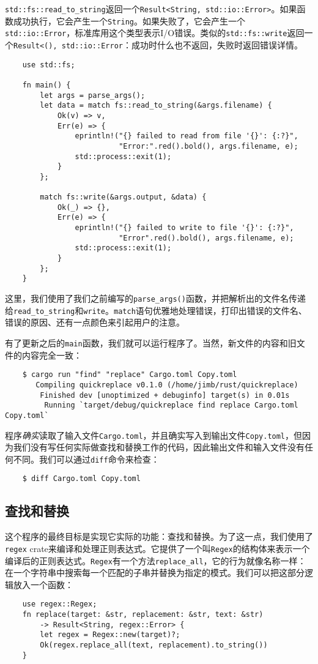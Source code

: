\texttt{std::fs::read\_to\_string}返回一个\texttt{Result<String, std::io::Error>}。如果函数成功执行，它会产生一个\texttt{String}。如果失败了，它会产生一个\texttt{std::io::Error}，标准库用这个类型表示I/O错误。类似的\texttt{std::fs::write}返回一个\texttt{Result<(), std::io::Error}：成功时什么也不返回，失败时返回错误详情。

\begin{verbatim}
    use std::fs;

    fn main() {
        let args = parse_args();
        let data = match fs::read_to_string(&args.filename) {
            Ok(v) => v,
            Err(e) => {
                eprintln!("{} failed to read from file '{}': {:?}",
                          "Error:".red().bold(), args.filename, e);
                std::process::exit(1);
            }
        };

        match fs::write(&args.output, &data) {
            Ok(_) => {},
            Err(e) => {
                eprintln!("{} failed to write to file '{}': {:?}",
                          "Error".red().bold(), args.filename, e);
                std::process::exit(1);
            }
        };
    }
\end{verbatim}

这里，我们使用了我们之前编写的\texttt{parse\_args()}函数，并把解析出的文件名传递给\texttt{read\_to\_string}和\texttt{write}。\texttt{match}语句优雅地处理错误，打印出错误的文件名、错误的原因、还有一点颜色来引起用户的注意。

有了更新之后的\texttt{main}函数，我们就可以运行程序了。当然，新文件的内容和旧文件的内容完全一致：
\begin{verbatim}
    $ cargo run "find" "replace" Cargo.toml Copy.toml
       Compiling quickreplace v0.1.0 (/home/jimb/rust/quickreplace)
        Finished dev [unoptimized + debuginfo] target(s) in 0.01s
         Running `target/debug/quickreplace find replace Cargo.toml Copy.toml`
\end{verbatim}

程序\emph{确实}读取了输入文件\texttt{Cargo.toml}，并且确实写入到输出文件\texttt{Copy.toml}，但因为我们没有写任何实际做查找和替换工作的代码，因此输出文件和输入文件没有任何不同。我们可以通过\texttt{diff}命令来检查：
\begin{verbatim}
    $ diff Cargo.toml Copy.toml
\end{verbatim}

\subsection{查找和替换}
这个程序的最终目标是实现它实际的功能：查找和替换。为了这一点，我们使用了\texttt{regex} crate来编译和处理正则表达式。它提供了一个叫\texttt{Regex}的结构体来表示一个编译后的正则表达式。\texttt{Regex}有一个方法\texttt{replace\_all}，它的行为就像名称一样：在一个字符串中搜索每一个匹配的子串并替换为指定的模式。我们可以把这部分逻辑放入一个函数：
\begin{verbatim}
    use regex::Regex;
    fn replace(target: &str, replacement: &str, text: &str)
        -> Result<String, regex::Error> {
        let regex = Regex::new(target)?;
        Ok(regex.replace_all(text, replacement).to_string())
    }
\end{verbatim}


